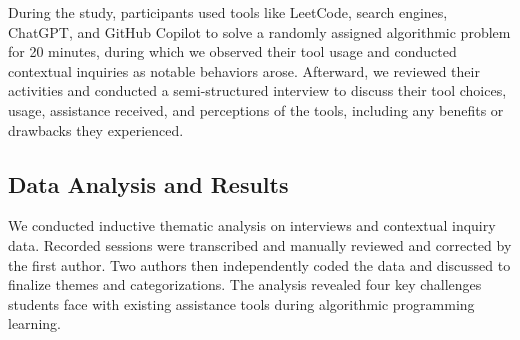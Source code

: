 During the study, participants used tools like LeetCode, search engines, ChatGPT, and GitHub Copilot to solve a randomly assigned algorithmic problem for 20 minutes, during which we observed their tool usage and conducted contextual inquiries as notable behaviors arose. Afterward, we reviewed their activities and conducted a semi-structured interview to discuss their tool choices, usage, assistance received, and perceptions of the tools, including any benefits or drawbacks they experienced.

\subsection{Data Analysis and Results}
We conducted inductive thematic analysis \cite{hsieh2005three} on interviews and contextual inquiry data. Recorded sessions were transcribed and manually reviewed and corrected by the first author. 
Two authors then independently coded the data and discussed to finalize themes and categorizations. 
The analysis revealed four key challenges students face with existing assistance tools during algorithmic programming learning.


